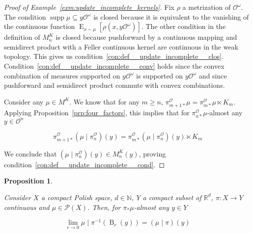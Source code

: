 \documentclass[11pt]{article}
\theoremstyle{definition}
\theoremstyle{plain}
\newtheorem{proposition}{Proposition}%
\newcommand{\Nats}{\mathbb{N}}
\newcommand{\Reals}{\mathbb{R}}
\newcommand{\B}{\operatorname{B}}
\DeclareMathOperator{\E}{E}
\newcommand{\PM}{\mathcal{P}}
\DeclareMathOperator{\Sp}{supp}
\newcommand{\Ob}{\mathcal{O}}
\newcommand{\OO}{\Ob^\omega}
\newcommand{\PO}{\pi^\Ob}
\begin{document}
\begin{proof}[Proof of Example~\ref{exm:update_incomplete_kernels}]
Fix $\rho$ a metrization of $\OO$. The condition $\Sp{\mu} \subseteq y\OO$ is closed because it is equivalent to the vanishing of the continuous function $\E_{x\sim\mu}\left[\rho\left(x,y\OO\right)\right]$. The other condition in the definition of $M^K_n$ is closed because pushforward by a continuous mapping and semidirect product with a Feller continuous kernel are continuous in the weak topology. This gives us condition~\ref{con:def__update_incomplete__clos}. Condition~\ref{con:def__update_incomplete__conv} holds since the convex combination of measures supported on $y\OO$ is supported on $y\OO$ and since pushforward and semidirect product commute with convex combinations.

Consider any $\mu \in M^K$. We know that for any $m \geq n$, $\PO_{m+1*}\mu=\PO_{m*}\mu \ltimes K_m$. Applying Proposition~\ref{prp:four_factors}, this implies that for $\PO_{n*}\mu$-almost any $y\in\Ob^n$

\[\PO_{m+1*}\left(\mu \mid \PO_n\right)(y)=\PO_{m*}\left(\mu \mid \PO_n\right)(y) \ltimes K_m\]

We conclude that $\left(\mu \mid \PO_n\right)(y) \in M^K_n(y)$, proving condition~\ref{con:def__update_incomplete__cond}.
\end{proof}

\begin{samepage}
\begin{proposition}
\label{prp:differentiation}

Consider $X$ a compact Polish space, $d \in \Nats$, $Y$ a compact subset of $\Reals^d$, $\pi: X \rightarrow Y$ continuous and $\mu \in \PM\left(X\right)$. Then, for $\pi_*\mu$-almost any $y \in Y$

\begin{equation}
\lim_{r \rightarrow 0}{\mu \mid \pi^{-1}\left(\B_r\left(y\right)\right) = \left(\mu \mid \pi\right)\left(y\right)}
\end{equation}

\end{proposition}
\end{samepage}
\end{document}
